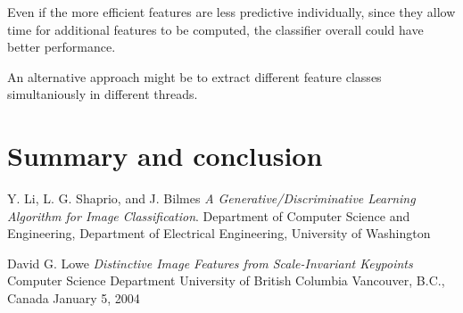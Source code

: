 \documentclass[11pt]{article}
\begin{document}
Even if the more efficient features are less predictive individually,
since they allow time for additional features to be computed, the
classifier overall could have better performance.

An alternative approach might be to extract different feature classes
simultaniously in different threads.


\section{Summary and conclusion}

\begin{thebibliography}{9}

  Y. Li, L. G. Shaprio, and J. Bilmes
  \emph{A Generative/Discriminative Learning Algorithm for Image Classification}.
  Department of Computer Science and Engineering,
  Department of Electrical Engineering,
  University of Washington

  David G. Lowe
  \emph{Distinctive Image Features from Scale-Invariant Keypoints}
  Computer Science Department
  University of British Columbia
  Vancouver, B.C., Canada
  January 5, 2004

\end{thebibliography}
\end{document}
